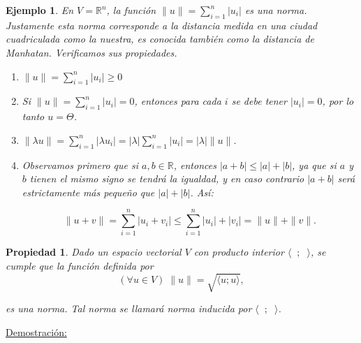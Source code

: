 \documentclass[12pt]{book}
\newtheorem{prop}{Propiedad}
\newtheorem{ejem}{Ejemplo}
\def\R{\mathbb{R}}
\begin{document}
{\vspace{0.3 cm}

\begin{ejem}
{\em En $V=\R^n$, la función $\|u\|=\displaystyle{\sum_{i=1}^n |u_i|}$ es una norma.
  Justamente esta norma corresponde a la distancia medida en una ciudad cuadriculada como la nuestra, es conocida también como la \emph{distancia de Manhatan}.
  Verificamos sus propiedades.
  \begin{enumerate}
  \item $\|u\|=\sum_{i=1}^n |u_i|\ge0$ 
  \item Si $\|u\|=\sum_{i=1}^n |u_i|=0$, entonces para cada $i$ se debe tener $|u_i|=0$, por lo tanto $u=\Theta$.
  \item $\|\lambda u\|=\sum_{i=1}^n |\lambda u_i|=|\lambda|\sum_{i=1}^n |u_i|=|\lambda|\|u\|$.
  \item Observamos primero que si $a,b\in \R$, entonces $|a+b|\le |a|+|b|$, ya que si $a$ y $b$ tienen el mismo signo se tendrá la igualdad, y en caso contrario $|a+b|$ será estrictamente más pequeño que $|a|+|b|$.
    Así:
    
    $$\|u+v\|=\sum_{i=1}^n |u_i+v_i|\le\sum_{i=1}^n |u_i|+|v_i|=\|u\|+\|v\|.$$
  \end{enumerate}
}


\end{ejem}

\vspace{0.3 cm}

\begin{prop}
Dado un espacio vectorial $V$ con producto interior $\langle\phantom{x};\phantom{x}\rangle$, se cumple que la funci\'on definida por 
$$ (\forall u\in V)\;\|u\|=\sqrt{\langle u;u\rangle},$$

es una norma. Tal norma se llamar\'a \emph{norma inducida} por $\langle\phantom{x};\phantom{x}\rangle$.
\end{prop}


\underline{Demostraci\'on:} 

}
\end{document}

